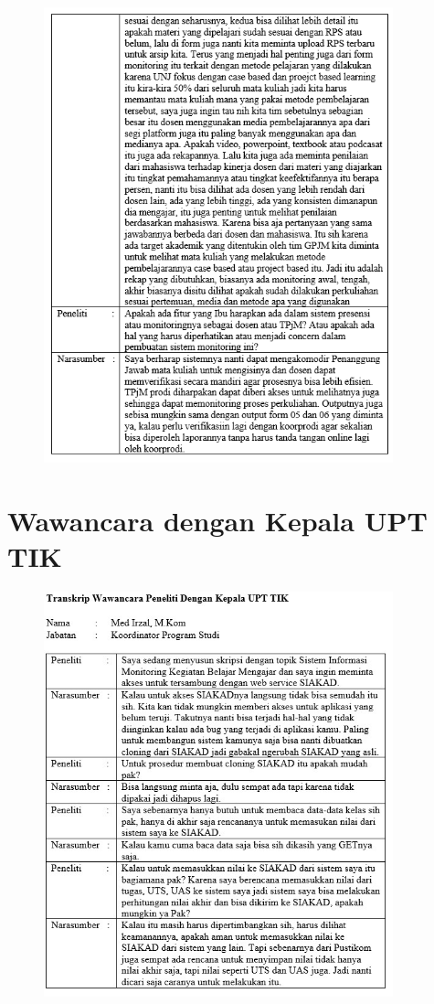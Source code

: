 \begin{figure}[H]
	\centering
	\includegraphics[width=0.9\textwidth]{gambar/lampiran/UR-5}	
\end{figure}

\chapter{Wawancara dengan Kepala UPT TIK}

\begin{figure}[H]
	\centering
	\includegraphics[width=0.9\textwidth]{gambar/lampiran/Wawancara Upt TIK}	
\end{figure}

